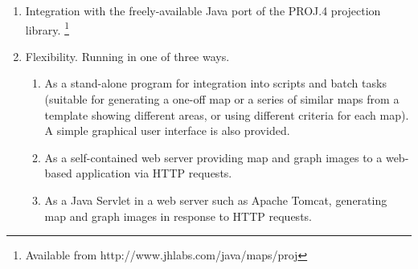 \begin{enumerate}
\item
Integration with the freely-available
Java port of the PROJ.4 projection library.
\footnote{Available from http://www.jhlabs.com/java/maps/proj}

\item
Flexibility.  Running in one of three ways.

\begin{enumerate}
\item
As a stand-alone program for integration into
scripts and batch tasks (suitable for generating a one-off
map or a series of similar maps from a template
showing different areas, or using different criteria for each map).
A simple graphical user interface is also provided.

\item
As a self-contained web server providing map and
graph images to a web-based application via HTTP requests.

\item
As a Java Servlet in a web server such as Apache Tomcat,
generating map and graph images in response to HTTP requests.

\end{enumerate}

\end{enumerate}

